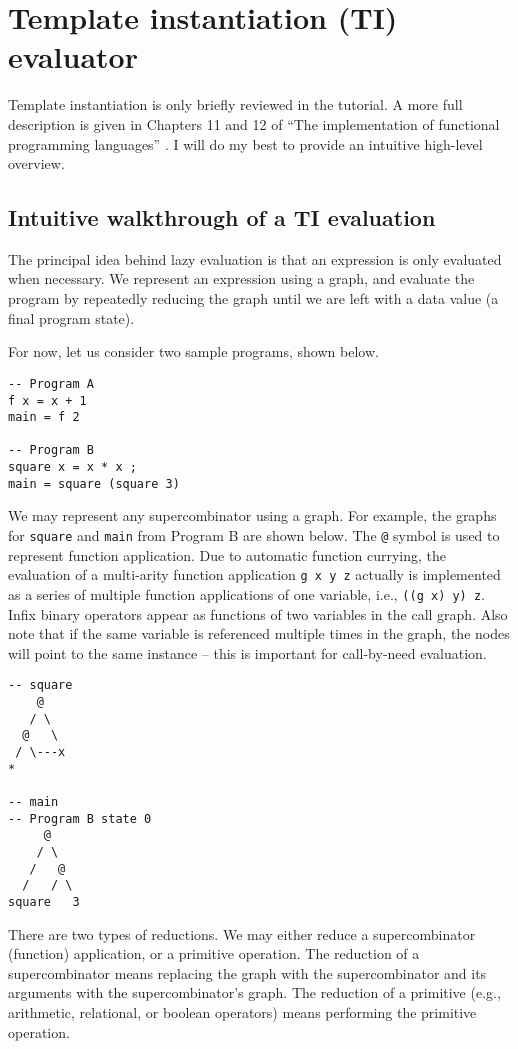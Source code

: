 \section{Template instantiation (TI) evaluator}
\label{sec:ti}

Template instantiation is only briefly reviewed in the tutorial. A more full description is given in Chapters 11 and 12 of ``The implementation of functional programming languages'' \cite{peyton1987implementation}. I will do my best to provide an intuitive high-level overview.

\subsection{Intuitive walkthrough of a TI evaluation}
\label{sec:ti-walkthrough}

The principal idea behind lazy evaluation is that an expression is only evaluated when necessary. We represent an expression using a graph, and evaluate the program by repeatedly reducing the graph until we are left with a data value (a final program state).

For now, let us consider two sample programs, shown below.

\begin{verbatim}
-- Program A
f x = x + 1
main = f 2
  
-- Program B
square x = x * x ;
main = square (square 3)
\end{verbatim}

We may represent any supercombinator using a graph. For example, the graphs for \texttt{square} and \texttt{main} from Program B are shown below. The \texttt{@} symbol is used to represent function application. Due to automatic function currying, the evaluation of a multi-arity function application \texttt{g x y z} actually is implemented as a series of multiple function applications of one variable, i.e., \texttt{((g x) y) z}. Infix binary operators appear as functions of two variables in the call graph. Also note that if the same variable is referenced multiple times in the graph, the nodes will point to the same instance -- this is important for call-by-need evaluation.

\begin{verbatim}
-- square
    @
   / \
  @   \
 / \---x
*

-- main
-- Program B state 0
     @
    / \
   /   @
  /   / \
square   3
\end{verbatim}

There are two types of reductions. We may either reduce a supercombinator (function) application, or a primitive operation. The reduction of a supercombinator means replacing the graph with the supercombinator and its arguments with the supercombinator's graph. The reduction of a primitive (e.g., arithmetic, relational, or boolean operators) means performing the primitive operation.

